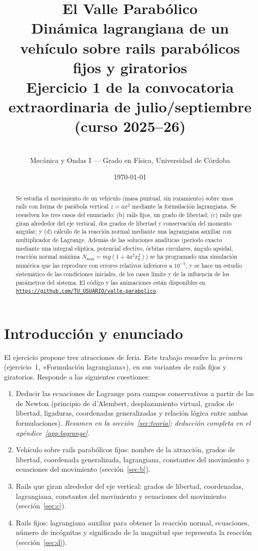 \documentclass[11pt,a4paper]{article}
\title{\vspace{-1cm}\textbf{El Valle Parabólico}\\[2mm]
\large Dinámica lagrangiana de un vehículo sobre rails parabólicos fijos y giratorios\\[1mm]
\normalsize Ejercicio 1 de la convocatoria extraordinaria de julio/septiembre (curso 2025--26)}
\author{\autor\\[1mm] \small Mecánica y Ondas I --- Grado en Física, Universidad de Córdoba}
\date{\today}
\newcommand{\repoURL}{https://github.com/TU\_USUARIO/valle-parabolico}      %
\newcommand{\repoHREF}{https://github.com/TU_USUARIO/valle-parabolico}     %
\begin{document}
\maketitle

\begin{abstract}
Se estudia el movimiento de un vehículo (masa puntual, sin rozamiento) sobre unos rails con forma
de parábola vertical $z=ax^2$ mediante la formulación lagrangiana. Se resuelven los tres casos del enunciado:
(b) rails fijos, un grado de libertad; (c) rails que giran alrededor del eje vertical, dos grados de libertad y
conservación del momento angular; y (d) cálculo de la reacción normal mediante una lagrangiana auxiliar con
multiplicador de Lagrange. Además de las soluciones analíticas (periodo exacto mediante una integral elíptica,
potencial efectivo, órbitas circulares, ángulo apsidal, reacción normal máxima $N_{\max}=mg(1+4a^2x_0^2)$)
se ha programado una simulación numérica que las reproduce con errores relativos
inferiores a $10^{-7}$, y se hace un estudio sistemático de las condiciones iniciales, de los casos límite y de la influencia de los
parámetros del sistema. El código y las animaciones están disponibles en
\href{\repoHREF}{\texttt{\repoURL}}.
\end{abstract}

\tableofcontents

\section{Introducción y enunciado}
El ejercicio propone tres atracciones de feria. Este trabajo resuelve la \emph{primera} (ejercicio~1,
«Formulación lagrangiana»), en sus variantes de rails fijos y giratorios. Responde a las siguientes cuestiones:
\begin{enumerate}[label=\alph*),leftmargin=*]
  \item Deducir las ecuaciones de Lagrange para campos conservativos a partir de las de Newton (principio de
        d'Alembert, desplazamiento virtual, grados de libertad, ligaduras, coordenadas generalizadas y relación
        lógica entre ambas formulaciones). \emph{Resumen en la sección~\ref{sec:teoria}; deducción completa en el apéndice~\ref{app:lagrange}.}
  \item Vehículo sobre rails parabólicos fijos: nombre de la atracción, grados de libertad, coordenada
        generalizada, lagrangiana, constantes del movimiento y ecuaciones del movimiento (sección~\ref{sec:b}).
  \item Rails que giran alrededor del eje vertical: grados de libertad, coordenadas, lagrangiana, constantes del
        movimiento y ecuaciones del movimiento (sección~\ref{sec:c}).
  \item Rails fijos: lagrangiana auxiliar para obtener la reacción normal, ecuaciones, número de incógnitas y
        significado de la magnitud que representa la reacción (sección~\ref{sec:d}).
\end{enumerate}
\end{document}
